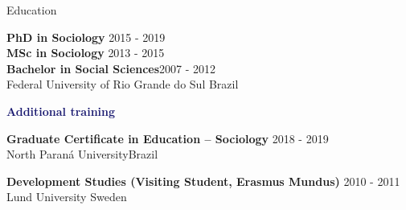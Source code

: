 \begin{rSection}{Education}

{\bf PhD in Sociology} \hfill {2015 - 2019} \\
{\bf MSc in Sociology} \hfill {2013 - 2015} \\
{\bf Bachelor in Social Sciences}\hfill {2007 - 2012}\\
{Federal University of Rio Grande do Sul} \hfill {Brazil}

\textcolor{MidnightBlue}{\textbf{Additional training}}

{\textbf{Graduate Certificate in Education – Sociology }}{\hfill  2018 - 2019}\\ 
{North Paraná University}\hfill{Brazil}\par
{\bf Development Studies (Visiting Student, Erasmus Mundus)} \hfill 
{2010 - 2011} \\
{Lund University} \hfill {Sweden} 

\end{rSection}